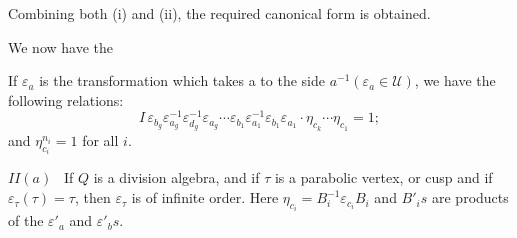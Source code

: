 Combining both (i) and (ii), the required canonical form is obtained. 

We now have the 
\begin{theorem}\label{chap2:sec5:thm2} %
  If $\varepsilon_a$ is the transformation which takes a to the
    side $a^{-1} (\varepsilon_a \in \mathscr{U})$, we have the
    following relations: 
  $$
  I \,\varepsilon_{b_g} \varepsilon^{-1}_{a_g} \varepsilon_{d_g}^{-1}
  \varepsilon_{a_g} \cdots \varepsilon_{b_1} \varepsilon^{-1}_{a_1}
  \varepsilon_{b_1} \varepsilon_{a_1} \cdot \eta_{c_k} \cdots
  \eta_{c_1} = 1; 
  $$
  and $\eta^{n_i}_{c_i} = 1$ for all $i$. 
\end{theorem}

$II (a)$ ~If $Q$ is a division algebra, and if $\tau$ is a parabolic
vertex, or cusp and if $\varepsilon_{\tau} (\tau) =\tau$, then
$\varepsilon_{\tau}$ is of infinite order. Here $\eta_{c_i}=
B^{-1}_{i} \varepsilon_{c_i} B_i$ and $B'_i  s$ are products of the
$\varepsilon'_a$ and $\varepsilon'_b  s$.  

